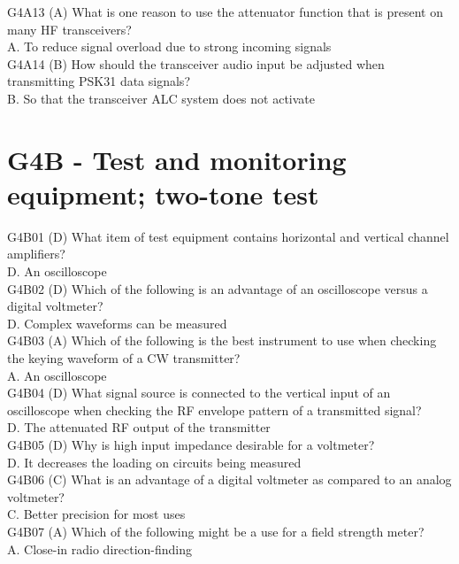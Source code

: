 \documentclass[12pt,letterpaper]{report}
\begin{document}
G4A13 (A) What is one reason to use the attenuator function that is present on many HF transceivers?\\
A. To reduce signal overload due to strong incoming signals\\

G4A14 (B) How should the transceiver audio input be adjusted when transmitting PSK31 data signals?\\
B. So that the transceiver ALC system does not activate\\

\section{G4B - Test and monitoring equipment; two-tone test}

G4B01 (D) What item of test equipment contains horizontal and vertical channel amplifiers?\\
D. An oscilloscope\\

G4B02 (D) Which of the following is an advantage of an oscilloscope versus a digital voltmeter?\\
D. Complex waveforms can be measured\\

G4B03 (A) Which of the following is the best instrument to use when checking the keying waveform of a CW transmitter?\\
A. An oscilloscope\\

G4B04 (D) What signal source is connected to the vertical input of an oscilloscope when checking the RF envelope pattern of a transmitted signal?\\
D. The attenuated RF output of the transmitter\\

G4B05 (D) Why is high input impedance desirable for a voltmeter?\\
D. It decreases the loading on circuits being measured\\

G4B06 (C) What is an advantage of a digital voltmeter as compared to an analog voltmeter?\\
C. Better precision for most uses\\

G4B07 (A) Which of the following might be a use for a field strength meter?\\
A. Close-in radio direction-finding\\
\end{document}
